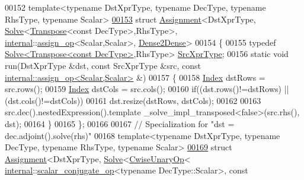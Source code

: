 \begin{DoxyCode}
00152 \textcolor{keyword}{template}<\textcolor{keyword}{typename} DstXprType, \textcolor{keyword}{typename} DecType, \textcolor{keyword}{typename} RhsType, \textcolor{keyword}{typename} Scalar>
\hyperlink{struct_eigen_1_1internal_1_1_assignment_3_01_dst_xpr_type_00_01_solve_3_01_transpose_3_01const_002733ef61eadb9652bc6bc1dd0938391}{00153} \textcolor{keyword}{struct }\hyperlink{struct_eigen_1_1internal_1_1_assignment}{Assignment}<DstXprType, \hyperlink{group___core___module_class_eigen_1_1_solve}{Solve}<\hyperlink{group___core___module_class_eigen_1_1_transpose}{Transpose}<const DecType>,RhsType>, 
      \hyperlink{namespaceinternal}{internal}::\hyperlink{struct_eigen_1_1internal_1_1assign__op}{assign\_op}<Scalar,Scalar>, \hyperlink{struct_eigen_1_1internal_1_1_dense2_dense}{Dense2Dense}>
00154 \{
00155   \textcolor{keyword}{typedef} \hyperlink{group___core___module_class_eigen_1_1_solve}{Solve<Transpose<const DecType>},RhsType> 
      \hyperlink{group___core___module_class_eigen_1_1_solve}{SrcXprType};
00156   \textcolor{keyword}{static} \textcolor{keywordtype}{void} run(DstXprType &dst, \textcolor{keyword}{const} SrcXprType &src, \textcolor{keyword}{const} 
      \hyperlink{struct_eigen_1_1internal_1_1assign__op}{internal::assign\_op<Scalar,Scalar>} &)
00157   \{
00158     \hyperlink{namespace_eigen_a62e77e0933482dafde8fe197d9a2cfde}{Index} dstRows = src.rows();
00159     \hyperlink{namespace_eigen_a62e77e0933482dafde8fe197d9a2cfde}{Index} dstCols = src.cols();
00160     \textcolor{keywordflow}{if}((dst.rows()!=dstRows) || (dst.cols()!=dstCols))
00161       dst.resize(dstRows, dstCols);
00162 
00163     src.dec().nestedExpression().template \_solve\_impl\_transposed<false>(src.rhs(), dst);
00164   \}
00165 \};
00166 
00167 \textcolor{comment}{// Specialization for "dst = dec.adjoint().solve(rhs)"}
00168 \textcolor{keyword}{template}<\textcolor{keyword}{typename} DstXprType, \textcolor{keyword}{typename} DecType, \textcolor{keyword}{typename} RhsType, \textcolor{keyword}{typename} Scalar>
\hyperlink{struct_eigen_1_1internal_1_1_assignment_3_01_dst_xpr_type_00_01_solve_3_01_cwise_unary_op_3_01in7a0cdfc0a6924bfcd9bc281e374a4ff8}{00169} \textcolor{keyword}{struct }\hyperlink{struct_eigen_1_1internal_1_1_assignment}{Assignment}<DstXprType, \hyperlink{group___core___module_class_eigen_1_1_solve}{Solve}<\hyperlink{group___core___module_class_eigen_1_1_cwise_unary_op}{CwiseUnaryOp}<
      \hyperlink{namespaceinternal}{internal}::\hyperlink{struct_eigen_1_1internal_1_1scalar__conjugate__op}{scalar\_conjugate\_op}<typename DecType::Scalar>, const 

\end{DoxyCode}
